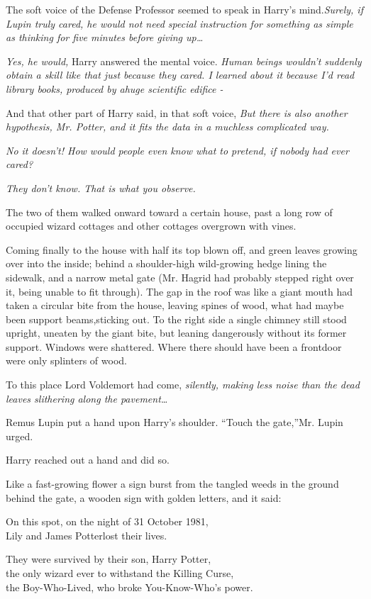 The soft voice of the Defense Professor seemed to speak in Harry's mind.\emph{Surely, if Lupin truly cared, he would not need special instruction for something as simple as thinking for five minutes before giving up\ldots{}}

\emph{Yes, he would,} Harry answered the mental voice. \emph{Human beings wouldn't suddenly obtain a skill like that just because they cared. I learned about it because I'd read library books, produced by ahuge scientific edifice -}

And that other part of Harry said, in that soft voice, \emph{But there is also another hypothesis, Mr. Potter, and it fits the data in a muchless complicated way.}

\emph{No it doesn't! How would people even know what to pretend, if nobody had ever cared?}

\emph{They don't know. That is what you observe.}

The two of them walked onward toward a certain house, past a long row of occupied wizard cottages and other cottages overgrown with vines.

Coming finally to the house with half its top blown off, and green leaves growing over into the inside; behind a shoulder-high wild-growing hedge lining the sidewalk, and a narrow metal gate (Mr. Hagrid had probably stepped right over it, being unable to fit through). The gap in the roof was like a giant mouth had taken a circular bite from the house, leaving spines of wood, what had maybe been support beams,sticking out. To the right side a single chimney still stood upright, uneaten by the giant bite, but leaning dangerously without its former support. Windows were shattered. Where there should have been a frontdoor were only splinters of wood.

To this place Lord Voldemort had come, \emph{silently, making less noise than the dead leaves slithering along the pavement\ldots{}}

Remus Lupin put a hand upon Harry's shoulder. ``Touch the gate,''Mr. Lupin urged.

Harry reached out a hand and did so.

Like a fast-growing flower a sign burst from the tangled weeds in the ground behind the gate, a wooden sign with golden letters, and it said:

On this spot, on the night of 31 October 1981,\\ Lily and James Potterlost their lives.

They were survived by their son, Harry Potter,\\ the only wizard ever to withstand the Killing Curse,\\ the Boy-Who-Lived, who broke You-Know-Who's power.


